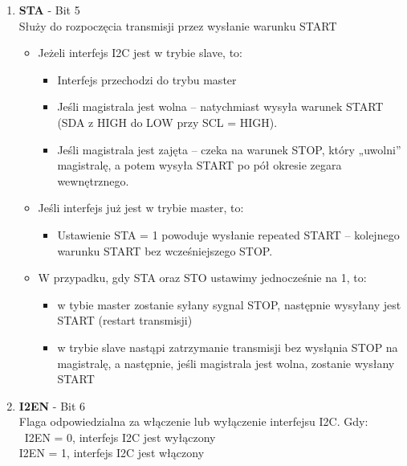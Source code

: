 \documentclass{article}
\begin{document}
\begin{itemize}
\begin{enumerate}
        \item \textbf{STA} - Bit 5\\
            Służy do rozpoczęcia transmisji przez wysłanie warunku START
                \begin{itemize}
                    \item Jeżeli interfejs I2C jest w trybie slave, to:
                    \begin{itemize}
                        \item Interfejs przechodzi do trybu master
                        \item Jeśli magistrala jest wolna – natychmiast wysyła warunek START (SDA z HIGH do LOW przy SCL = HIGH).
                        \item Jeśli magistrala jest zajęta – czeka na warunek STOP, który „uwolni” magistralę, a potem wysyła START po pół okresie zegara wewnętrznego.
                    \end{itemize}

                    \item Jeśli interfejs już jest w trybie master, to:
                    \begin{itemize}
                        \item Ustawienie STA = 1 powoduje wysłanie repeated START – kolejnego warunku START bez wcześniejszego STOP.
                    \end{itemize}   
                    \item W przypadku, gdy STA oraz STO ustawimy jednocześnie na 1, to:
                    \begin{itemize}
                        \item w tybie master zostanie syłany sygnal STOP, następnie wysyłany jest START (restart transmisji)
                        \item w trybie slave nastąpi zatrzymanie transmisji bez wysłąnia STOP na magistralę, a następnie, jeśli magistrala jest wolna, zostanie wysłany START
                    \end{itemize}
                \end{itemize}
        \item \textbf{I2EN} - Bit 6\\
        Flaga odpowiedzialna za włączenie lub wyłączenie interfejsu I2C. Gdy:\\\
            I2EN = 0, interfejs I2C jest wyłączony\\
            I2EN = 1, interfejs I2C jest włączony
            

\end{enumerate}
\end{itemize}
\end{document}
